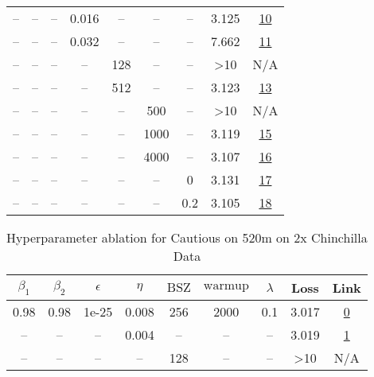 \begin{table}[H]
\begin{tabular}{ccccccccc}
-- & -- & -- & 0.016 & -- & -- & -- & 3.125 & \href{https://wandb.ai/stanford-mercury/optimizer-scaling/runs/sweep-520m-10B-cautiouse471f6lr0.016-wd0.1-minlr0-warmup2000-b10-bfc30c}{10} \\
-- & -- & -- & 0.032 & -- & -- & -- & 7.662 & \href{https://wandb.ai/stanford-mercury/optimizer-scaling/runs/sweep-520m-10B-cautious78e82clr0.032-wd0.1-minlr0-warmup2000-b10-5beb17}{11} \\
-- & -- & -- & -- & 128 & -- & -- & >10 & N/A \\
-- & -- & -- & -- & 512 & -- & -- & 3.123 & \href{https://wandb.ai/stanford-mercury/optimizer-scaling/runs/sweep-520m-10B-cautious51724blr0.008-wd0.1-minlr0-warmup2000-b10-9e973d}{13} \\
-- & -- & -- & -- & -- & 500 & -- & >10 & N/A \\
-- & -- & -- & -- & -- & 1000 & -- & 3.119 & \href{https://wandb.ai/stanford-mercury/optimizer-scaling/runs/sweep-520m-10B-cautious383408lr0.008-wd0.1-minlr0-warmup1000-b10-4b5602}{15} \\
-- & -- & -- & -- & -- & 4000 & -- & 3.107 & \href{https://wandb.ai/stanford-mercury/optimizer-scaling/runs/sweep-520m-10B-cautious2cb775lr0.008-wd0.1-minlr0-warmup4000-b10-0fed88}{16} \\
-- & -- & -- & -- & -- & -- & 0 & 3.131 & \href{https://wandb.ai/stanford-mercury/optimizer-scaling/runs/sweep-520m-10B-cautious589f93lr0.008-wd0-minlr0-warmup2000-b10.9-10ee8d}{17} \\
-- & -- & -- & -- & -- & -- & 0.2 & 3.105 & \href{https://wandb.ai/stanford-mercury/optimizer-scaling/runs/sweep-520m-10B-cautious413a92lr0.008-wd0.2-minlr0-warmup2000-b10-75bee0}{18} \\
\bottomrule
\end{tabular}
\end{table}

\begin{table}[H]
\centering
\caption{Hyperparameter ablation for Cautious on 520m on 2x Chinchilla Data}
\label{tab:ablation_cautious_520m_2}
\begin{tabular}{ccccccccc}
\toprule
$\beta_1$ & $\beta_2$ & $\epsilon$ & $\eta$ & $\mathrm{BSZ}$ & $\mathrm{warmup}$ & $\lambda$ & Loss & Link \\
\midrule
0.98 & 0.98 & 1e-25 & 0.008 & 256 & 2000 & 0.1 & 3.017 & \href{https://wandb.ai/stanford-mercury/optimizer-scaling/runs/sweep-520m-21B-cautiousc38916lr0.008-wd0.1-minlr0-warmup2000-b10-e8000b}{0} \\
\midrule
-- & -- & -- & 0.004 & -- & -- & -- & 3.019 & \href{https://wandb.ai/stanford-mercury/optimizer-scaling/runs/sweep-520m-21B-cautious1579b5lr0.004-wd0.1-minlr0-warmup2000-b10-ef172f}{1} \\
-- & -- & -- & -- & 128 & -- & -- & >10 & N/A \\
\bottomrule
\end{tabular}
\end{table}

